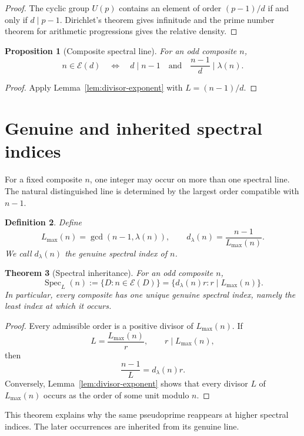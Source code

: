 \documentclass[11pt]{article}
\newtheorem{theorem}{Theorem}[section]
\newtheorem{proposition}[theorem]{Proposition}
\newtheorem{definition}[theorem]{Definition}
\newcommand{\Spec}{\operatorname{Spec}}
\newcommand{\Eset}{\mathcal E}
\begin{document}
\begin{proof}
The cyclic group $U(p)$ contains an element of order $(p-1)/d$ if and only if
$d\mid p-1$.  Dirichlet's theorem gives infinitude and the prime number theorem
for arithmetic progressions gives the relative density.
\end{proof}

\begin{proposition}[Composite spectral line]
\label{prop:composite-spectrum}
For an odd composite $n$,
\[
n\in\Eset(d)
\quad\Longleftrightarrow\quad
d\mid n-1
\quad\text{and}\quad
\frac{n-1}{d}\mid\lambda(n).
\]
\end{proposition}

\begin{proof}
Apply Lemma~\ref{lem:divisor-exponent} with $L=(n-1)/d$.
\end{proof}

\section{Genuine and inherited spectral indices}

For a fixed composite $n$, one integer may occur on more than one
spectral line.  The natural distinguished line is determined by the
largest order compatible with $n-1$.

\begin{definition}
Define
\[
L_{\max}(n)=\gcd(n-1,\lambda(n)),
\qquad
d_\lambda(n)=\frac{n-1}{L_{\max}(n)}.
\]
We call $d_\lambda(n)$ the \emph{genuine spectral index} of $n$.
\end{definition}

\begin{theorem}[Spectral inheritance]
\label{thm:inheritance}
For an odd composite $n$,
\[
\Spec_L(n)
:=
\{D:n\in\Eset(D)\}
=
\{d_\lambda(n)r:r\mid L_{\max}(n)\}.
\]
In particular, every composite has one unique genuine spectral index,
namely the least index at which it occurs.
\end{theorem}

\begin{proof}
Every admissible order is a positive divisor of
$L_{\max}(n)$.  If
\[
L=\frac{L_{\max}(n)}r,
\qquad r\mid L_{\max}(n),
\]
then
\[
\frac{n-1}{L}
=
d_\lambda(n)r.
\]
Conversely, Lemma~\ref{lem:divisor-exponent} shows that every divisor
$L$ of $L_{\max}(n)$ occurs as the order of some unit modulo $n$.
\end{proof}

This theorem explains why the same pseudoprime reappears at higher
spectral indices.  The later occurrences are inherited from its genuine
line.
\end{document}
